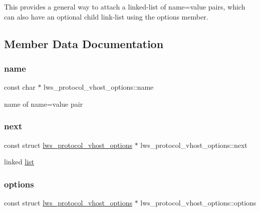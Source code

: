 This provides a general way to attach a linked-\/list of name=value pairs, which can also have an optional child link-\/list using the options member. 

\subsection{Member Data Documentation}
\mbox{\label{structlws__protocol__vhost__options_a551d9993c232c4366605769b9e9d5c31}} 
\subsubsection{\texorpdfstring{name}{name}}
{\footnotesize\ttfamily const char $\ast$ lws\+\_\+protocol\+\_\+vhost\+\_\+options\+::name}

name of name=value pair \mbox{\label{structlws__protocol__vhost__options_ad7757018921b07c115404d76ff037fb4}} 
\subsubsection{\texorpdfstring{next}{next}}
{\footnotesize\ttfamily const struct \hyperlink{structlws__protocol__vhost__options}{lws\+\_\+protocol\+\_\+vhost\+\_\+options} $\ast$ lws\+\_\+protocol\+\_\+vhost\+\_\+options\+::next}

linked \hyperlink{protocollist-p}{list} \mbox{\label{structlws__protocol__vhost__options_a0c6c60ab43c6d5105c7d1d79cc399b05}} 
\subsubsection{\texorpdfstring{options}{options}}
{\footnotesize\ttfamily const struct \hyperlink{structlws__protocol__vhost__options}{lws\+\_\+protocol\+\_\+vhost\+\_\+options} $\ast$ lws\+\_\+protocol\+\_\+vhost\+\_\+options\+::options}

